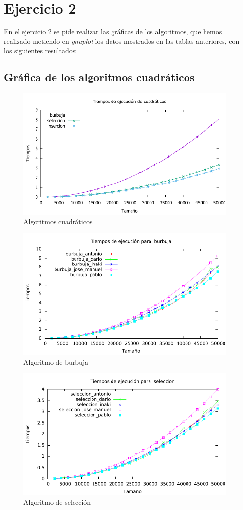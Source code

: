 \documentclass[a4paper, 11pt]{article}
\begin{document}
\newpage
\section{Ejercicio 2}

En el ejercicio 2 se pide realizar las gráficas de los algoritmos, que hemos
realizado metiendo en \textit{gnuplot} los datos mostrados en las tablas anteriores,
con los siguientes resultados:

\subsection{Gráfica de los algoritmos cuadráticos}
\begin{figure}[h] \includegraphics[width=11cm]{comparativa_cuadraticos_g} \centering
	\caption{Algoritmos cuadráticos} \end{figure}

 \begin{figure}[h] \includegraphics[width=11cm]{burbuja_todos_g} \centering
 	\caption{Algoritmo de burbuja} \end{figure}

 \begin{figure}[h] \includegraphics[width=11cm]{seleccion_todos_g} \centering
 	\caption{Algoritmo de selección} \end{figure}
\end{document}
